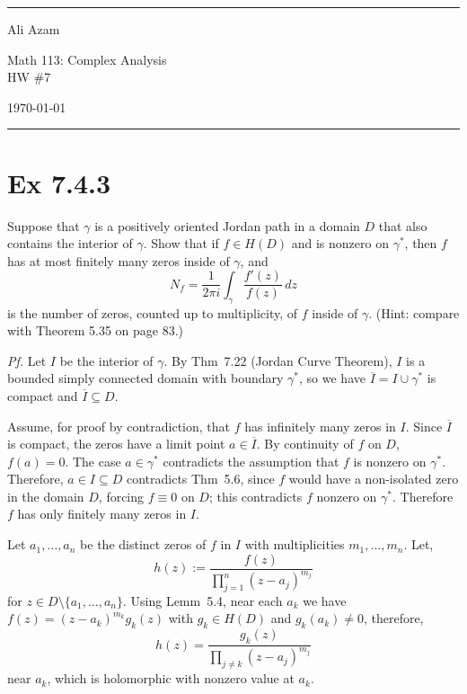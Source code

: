 \documentclass[a4paper]{article}
\begin{document}
\hrule\medskip
\begin{minipage}{0.295\textwidth}\raggedright\footnotesize
Ali Azam
\end{minipage}%
\begin{minipage}{0.4\textwidth}\centering
\large Math 113: Complex Analysis\\
\normalsize HW \#7
\end{minipage}%
\begin{minipage}{0.295\textwidth}\raggedleft
\today
\end{minipage}
\medskip\hrule\bigskip

\section*{Ex 7.4.3}

\begin{tcolorbox}[colback=gray!10, colframe=black, boxrule=0.5pt, arc=2mm]
Suppose that $\gamma$ is a positively oriented Jordan path in a domain $D$ that also contains
the interior of $\gamma$. Show that if $f \in H(D)$ and is nonzero on $\gamma^*$, then $f$ has
at most finitely many zeros inside of $\gamma$, and
\[
N_f = \frac{1}{2\pi i}\int_\gamma \frac{f'(z)}{f(z)}\,dz
\]
is the number of zeros, counted up to multiplicity, of $f$ inside of $\gamma$.
(Hint: compare with Theorem 5.35 on page 83.)
\end{tcolorbox}

\textit{Pf.} Let $I$ be the interior of $\gamma$. By Thm~7.22 (Jordan Curve Theorem), $I$ is a bounded
simply connected domain with boundary $\gamma^*$, so we have $\overline{I} = I \cup \gamma^*$ is compact
and $\overline{I} \subseteq D$.

\medskip
Assume, for proof by contradiction, that $f$ has infinitely many zeros in $I$.
Since $\overline{I}$ is compact, the zeros have a limit point $a \in \overline{I}$. By
continuity of $f$ on $D$, $f(a) = 0$. The case $a \in \gamma^*$ contradicts the assumption that
$f$ is nonzero on $\gamma^*$. Therefore, $a \in I \subseteq D$ contradicts Thm~5.6, since $f$
would have a non-isolated zero in the domain $D$, forcing $f \equiv 0$ on $D$; this
contradicts $f$ nonzero on $\gamma^*$. Therefore $f$ has only finitely many zeros in $I$.

\medskip
Let $a_1, \ldots, a_n$ be the distinct zeros of $f$ in $I$
with multiplicities $m_1, \ldots, m_n$. Let,
\[
h(z) := \frac{f(z)}{\prod_{j=1}^n (z - a_j)^{m_j}}
\]
for $z \in D \setminus \{a_1, \ldots, a_n\}$. Using Lemm~5.4, near each $a_k$ we have $f(z) = (z - a_k)^{m_k} g_k(z)$ with $g_k \in H(D)$ and
$g_k(a_k) \neq 0$, therefore,
\[
h(z) = \frac{g_k(z)}{\prod_{j \neq k}(z - a_j)^{m_j}}
\]
near $a_k$, which is holomorphic with nonzero value at $a_k$. 
\end{document}
